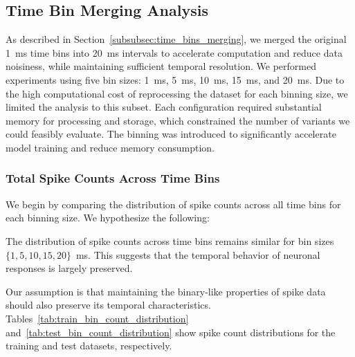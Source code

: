 \subsection{Time Bin Merging Analysis}
\label{subsec:time_bin_merging_analysis}
As described in Section~\ref{subsubsec:time_bins_merging}, we merged the original 1~ms time bins into 20~ms intervals to accelerate computation and reduce data noisiness, while maintaining sufficient temporal resolution. We performed experiments using five bin sizes: 1~ms, 5~ms, 10~ms, 15~ms, and 20~ms. Due to the high computational cost of reprocessing the dataset for each binning size, we limited the analysis to this subset. Each configuration required substantial memory for processing and storage, which constrained the number of variants we could feasibly evaluate. The binning was introduced to significantly accelerate model training and reduce memory consumption.

\subsubsection{Total Spike Counts Across Time Bins}
\label{subsubsec:spike_counts_time_bins}

We begin by comparing the distribution of spike counts across all time bins for each binning size. We hypothesize the following:

\begin{claim}
    The distribution of spike counts across time bins remains similar for bin sizes $\{1, 5, 10, 15, 20\}$~ms. This suggests that the temporal behavior of neuronal responses is largely preserved.
\end{claim}
\label{claim:tim_bin_counts}

Our assumption is that maintaining the binary-like properties of spike data should also preserve its temporal characteristics. Tables~\ref{tab:train_bin_count_distribution} and~\ref{tab:test_bin_count_distribution} show spike count distributions for the training and test datasets, respectively.

